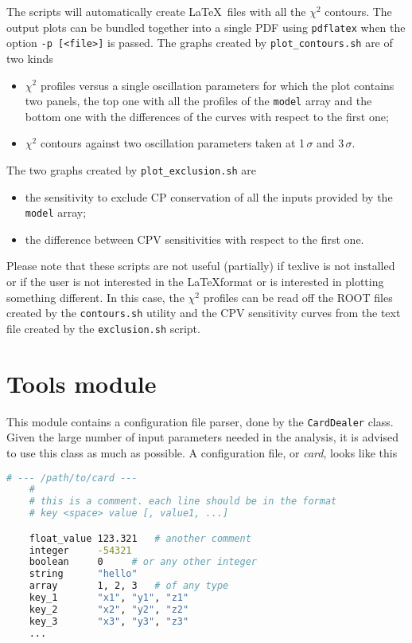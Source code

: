 \documentclass[a4paper, 11pt]{article}
\begin{document}
The scripts will automatically create \LaTeX\ files with all the $\chi^2$ contours. 
The output plots can be bundled together into a single PDF using \texttt{pdflatex} %
when the option \texttt{-p [<file>]} is passed.
The graphs created by \texttt{plot\_contours.sh} are of two kinds
\begin{itemize}
	\item $\chi^2$ profiles versus a single oscillation parameters for which the plot %
		contains two panels, the top one with all the profiles of the \texttt{model} array %
		and the bottom one with the differences of the curves with respect to the first one;
	\item $\chi^2$ contours against two oscillation parameters taken at 1\,$\sigma$ and 3\,$\sigma$.
\end{itemize}
The two graphs created by \texttt{plot\_exclusion.sh} are
\begin{itemize}
	\item the sensitivity to exclude CP conservation of all the inputs provided by %
		the \texttt{model} array;
	\item the difference between CPV sensitivities with respect to the first one.
\end{itemize}

Please note that these scripts are not useful (partially) if texlive is not installed or %
if the user is not interested in the \LaTeX format or is interested in plotting something different.
In this case, the $\chi^2$ profiles can be read off the ROOT files created by the \texttt{contours.sh} %
utility and the CPV sensitivity curves from the text file created by the \texttt{exclusion.sh} script.


\section{Tools module}

This module contains a configuration file parser, done by the \texttt{CardDealer} class.
Given the large number of input parameters needed in the analysis, it is advised to use this class as much as possible.
A configuration file, or \emph{card}, looks like this
\begin{lstlisting}[language=bash]
	# --- /path/to/card ---
	#
	# this is a comment. each line should be in the format
	# key <space> value [, value1, ...]

	float_value	123.321	  # another comment
	integer		-54321
	boolean		0	  # or any other integer
	string		"hello"
	array		1, 2, 3	  # of any type
	key_1		"x1", "y1", "z1"
	key_2		"x2", "y2", "z2"
	key_3		"x3", "y3", "z3"
	...
\end{lstlisting}
\end{document}
